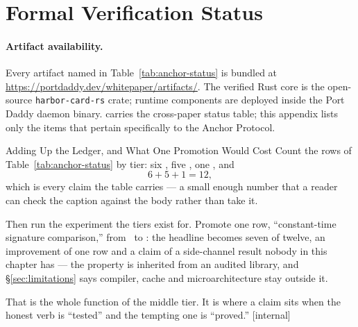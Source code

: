 \documentclass[11pt,a4paper]{article}
\theoremstyle{definition}
\begin{document}
\appendix

\section{Formal Verification Status}\label{app:anchor-mech}

\paragraph{Artifact availability.} Every artifact named in Table~\ref{tab:anchor-status} is bundled at \url{https://portdaddy.dev/whitepaper/artifacts/}. The verified Rust core is the open-source \texttt{harbor-card-rs} crate; runtime components are deployed inside the Port Daddy daemon binary.  carries the cross-paper status table; this appendix lists only the items that pertain specifically to the Anchor Protocol.

\begin{pdexample}{Adding Up the Ledger, and What One Promotion Would Cost}
\setlength{\parskip}{4pt plus 1pt}
Count the rows of Table~\ref{tab:anchor-status} by tier: six \Closed, five
\Partial, one \Open, and
\[
6 + 5 + 1 = 12,
\]
which is every claim the table
carries --- a small enough number that a reader can check the caption against
the body rather than take it.

Then run the experiment the tiers exist for.
Promote one row, ``constant-time signature comparison,'' from \Partial\ to
\Closed: the headline becomes seven of twelve, an improvement of one row and a
claim of a side-channel result nobody in this chapter has --- the property is
inherited from an audited library, and \S\ref{sec:limitations} says compiler,
cache and microarchitecture stay outside it.

That is the whole function of the
middle tier. It is where a claim sits when the honest verb is ``tested'' and
the tempting one is ``proved.'' [internal]
\end{pdexample}
\end{document}
